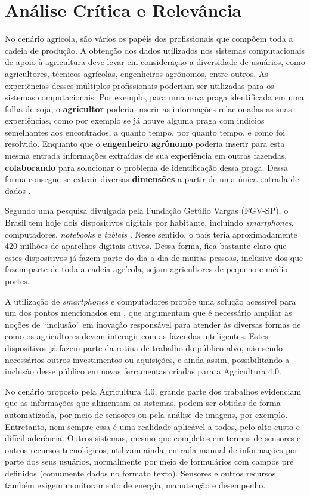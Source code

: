 \documentclass[12pt]{article}
\begin{document}
\section{Análise Crítica e Relevância}
\label{sec:analise_critica_relevancia}

No cenário agrícola, são vários os papéis dos profissionais que compõem toda a cadeia de produção. A obtenção dos dados utilizados nos sistemas computacionais de apoio à agricultura deve levar em consideração a diversidade de usuários, como agricultores, técnicos agrícolas, engenheiros agrônomos, entre outros. As experiências desses múltiplos profissionais poderiam ser utilizadas para os sistemas computacionais. Por exemplo, para uma nova praga identificada em uma folha de soja, o \textbf{agricultor} poderia inserir as informações relacionadas as suas experiências, como por exemplo se já houve alguma praga com indícios semelhantes aos encontrados, a quanto tempo, por quanto tempo, e como foi resolvido. Enquanto que o \textbf{engenheiro agrônomo} poderia inserir para esta mesma entrada informações extraídas de sua experiência em outras fazendas, \textbf{colaborando} para solucionar o problema de identificação dessa praga. Dessa forma consegue-se extrair diversas \textbf{dimensões} a partir de uma única entrada de dados \cite{Walling:2020}.

Segundo uma pesquisa divulgada pela Fundação Getúlio Vargas (FGV-SP), o Brasil tem hoje dois dispositivos digitais por habitante, incluindo \textit{smartphones}, computadores, \textit{notebooks} e \textit{tablets} \cite{FGV:2020}. Nesse sentido, o país teria aproximadamente 420 milhões de aparelhos digitais ativos. Dessa forma, fica bastante claro que estes dispositivos já fazem parte do dia a dia de muitas pessoas, inclusive dos que fazem parte de toda a cadeia agrícola, sejam agricultores de pequeno e médio portes.

A utilização de \textit{smartphones} e computadores propõe uma solução acessível para um dos pontos mencionados em , que argumentam que é necessário ampliar as noções de ``inclusão'' em inovação responsável para atender às diversas formas de como os agricultores devem interagir com as fazendas inteligentes. Estes dispositivos já fazem parte da rotina de trabalho do público alvo, não sendo necessários outros investimentos ou aquisições, e ainda assim, possibilitando a inclusão desse público em novas ferramentas criadas para a Agricultura 4.0.

No cenário proposto pela Agricultura 4.0, grande parte dos trabalhos evidenciam que as informações que alimentam os sistemas, podem ser obtidas de forma automatizada, por meio de sensores ou pela análise de imagens, por exemplo. Entretanto, nem sempre essa é uma realidade aplicável a todos, pelo alto custo e difícil aderência. Outros sistemas, mesmo que completos em termos de sensores e outros recursos tecnológicos, utilizam ainda, entrada manual de informações por parte dos seus usuários, normalmente por meio de formulários com campos pré definidos (comumente dados no formato texto). Sensores e outros recursos também exigem monitoramento de energia, manutenção e desempenho.
\end{document}
